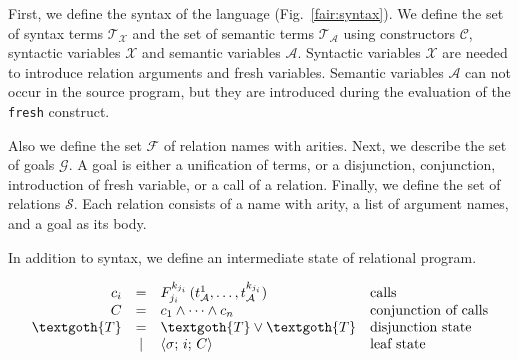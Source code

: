 First, we define the syntax of the language (Fig.~\ref{fair:syntax}). We define the set of syntax terms $\mathcal{T}_\mathcal{X}$ and the set of semantic terms
$\mathcal{T}_\mathcal{A}$ using constructors $\mathcal{C}$, syntactic variables $\mathcal{X}$ and semantic variables $\mathcal{A}$. Syntactic variables $\mathcal{X}$
are needed to introduce relation arguments and fresh variables. Semantic variables $\mathcal{A}$ can not occur in the source program, but they are introduced during
the evaluation of the \lstinline{fresh} construct.

Also we define the set $\mathcal{F}$ of relation names with arities. Next, we describe the set of goals $\mathcal{G}$. A goal is either a unification of terms, or a disjunction, conjunction, introduction
of fresh variable, or a call of a relation. Finally, we define the set of relations $\mathcal{S}$. Each relation consists of a name with arity, a list of argument names,
and a goal as its body.


In addition to syntax, we define an intermediate state of relational program.

\[
\begin{array}{rcll}
  c_i & = & F_{j_i}^{k_{j_i}}\,(t_\mathcal{A}^1,\dots,t_\mathcal{A}^{k_{j_i}}) & \mbox{calls} \\
  C & = &  c_1 \land \dots \land c_n  & \mbox{conjunction of calls} \\
  \textgoth{T} & = & \textgoth{T} \lor \textgoth{T} & \mbox{disjunction state} \\
               & \mid & \inbr{\sigma;\, i;\, C} & \mbox{leaf state}\\[1mm]
\end{array}
\]

